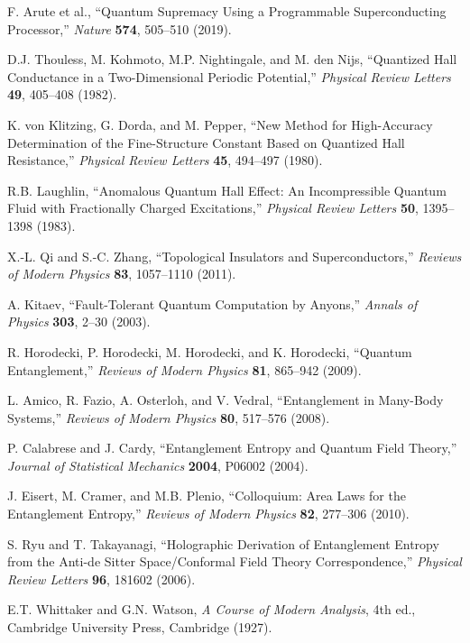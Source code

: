 \documentclass[11pt]{article}
\theoremstyle{plain}
\theoremstyle{definition}
\theoremstyle{remark}
\begin{document}
\begin{thebibliography}{99}
 F. Arute et al., ``Quantum Supremacy Using a Programmable Superconducting Processor,'' \emph{Nature} \textbf{574}, 505--510 (2019).

 D.J. Thouless, M. Kohmoto, M.P. Nightingale, and M. den Nijs, ``Quantized Hall Conductance in a Two-Dimensional Periodic Potential,'' \emph{Physical Review Letters} \textbf{49}, 405--408 (1982).

 K. von Klitzing, G. Dorda, and M. Pepper, ``New Method for High-Accuracy Determination of the Fine-Structure Constant Based on Quantized Hall Resistance,'' \emph{Physical Review Letters} \textbf{45}, 494--497 (1980).

 R.B. Laughlin, ``Anomalous Quantum Hall Effect: An Incompressible Quantum Fluid with Fractionally Charged Excitations,'' \emph{Physical Review Letters} \textbf{50}, 1395--1398 (1983).

 X.-L. Qi and S.-C. Zhang, ``Topological Insulators and Superconductors,'' \emph{Reviews of Modern Physics} \textbf{83}, 1057--1110 (2011).

 A. Kitaev, ``Fault-Tolerant Quantum Computation by Anyons,'' \emph{Annals of Physics} \textbf{303}, 2--30 (2003).

 R. Horodecki, P. Horodecki, M. Horodecki, and K. Horodecki, ``Quantum Entanglement,'' \emph{Reviews of Modern Physics} \textbf{81}, 865--942 (2009).

 L. Amico, R. Fazio, A. Osterloh, and V. Vedral, ``Entanglement in Many-Body Systems,'' \emph{Reviews of Modern Physics} \textbf{80}, 517--576 (2008).

 P. Calabrese and J. Cardy, ``Entanglement Entropy and Quantum Field Theory,'' \emph{Journal of Statistical Mechanics} \textbf{2004}, P06002 (2004).

 J. Eisert, M. Cramer, and M.B. Plenio, ``Colloquium: Area Laws for the Entanglement Entropy,'' \emph{Reviews of Modern Physics} \textbf{82}, 277--306 (2010).

 S. Ryu and T. Takayanagi, ``Holographic Derivation of Entanglement Entropy from the Anti-de Sitter Space/Conformal Field Theory Correspondence,'' \emph{Physical Review Letters} \textbf{96}, 181602 (2006).

 E.T. Whittaker and G.N. Watson, \emph{A Course of Modern Analysis}, 4th ed., Cambridge University Press, Cambridge (1927).


\end{thebibliography}
\end{document}
